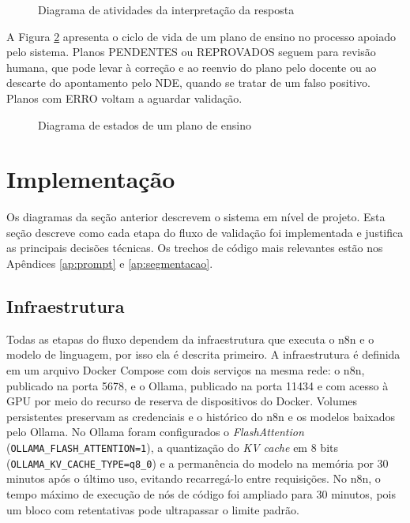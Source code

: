 \begin{figure}[htbp]
\centering
\caption{Diagrama de atividades da interpretação da resposta}
\label{fig:atividade}

\end{figure}

A Figura \ref{fig:estados} apresenta o ciclo de vida de um plano de ensino no processo apoiado pelo sistema. Planos PENDENTES ou REPROVADOS seguem para revisão humana, que pode levar à correção e ao reenvio do plano pelo docente ou ao descarte do apontamento pelo NDE, quando se tratar de um falso positivo. Planos com ERRO voltam a aguardar validação.

\begin{figure}[htbp]
\centering
\caption{Diagrama de estados de um plano de ensino}
\label{fig:estados}
\resizebox{\textwidth}{!}{}
\end{figure}

\section{Implementação}
\label{sec:implementacao}

Os diagramas da seção anterior descrevem o sistema em nível de projeto. Esta seção descreve como cada etapa do fluxo de validação foi implementada e justifica as principais decisões técnicas. Os trechos de código mais relevantes estão nos Apêndices \ref{ap:prompt} e \ref{ap:segmentacao}.

\subsection{Infraestrutura}

Todas as etapas do fluxo dependem da infraestrutura que executa o n8n e o modelo de linguagem, por isso ela é descrita primeiro. A infraestrutura é definida em um arquivo Docker Compose com dois serviços na mesma rede: o n8n, publicado na porta 5678, e o Ollama, publicado na porta 11434 e com acesso à GPU por meio do recurso de reserva de dispositivos do Docker. Volumes persistentes preservam as credenciais e o histórico do n8n e os modelos baixados pelo Ollama. No Ollama foram configurados o \textit{FlashAttention} (\texttt{OLLAMA\_FLASH\_ATTENTION=1}), a quantização do \textit{KV cache} em 8 bits (\texttt{OLLAMA\_KV\_CACHE\_TYPE=q8\_0}) e a permanência do modelo na memória por 30 minutos após o último uso, evitando recarregá-lo entre requisições. No n8n, o tempo máximo de execução de nós de código foi ampliado para 30 minutos, pois um bloco com retentativas pode ultrapassar o limite padrão.

